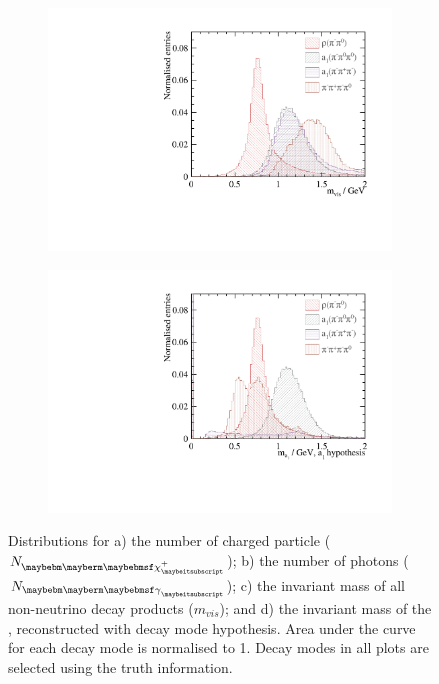 \begin{figure}[htbp]
\begin{subfigure}[b]{0.45\textwidth}
 \includegraphics[width=\textwidth]{tau/var2/mVis_100GeV_improved_zoom.pdf}
  \caption{}
  \label{fig:tauVarMVis}
\end{subfigure}
\begin{subfigure}[b]{0.45\textwidth}
 \includegraphics[width=\textwidth]{tau/var2/mA1A1Fit_100GeV_improved_zoom.pdf}
  \caption{}
  \label{fig:tauVarMA1}
\end{subfigure}

\caption
{Distributions for a) the number of charged particle (${N}_{\charge}$); b) the number of photons (${N}_{\Pgg}$); c) the invariant mass of all non-neutrino decay products ($m_{vis}$); and d) the invariant mass of the \Pai, reconstructed with \decayAiPhotonShort decay mode hypothesis. Area under the curve for each decay mode is normalised to 1. Decay modes in all plots are selected using the truth information.}
\label{fig:tauVar}
\end{figure}


